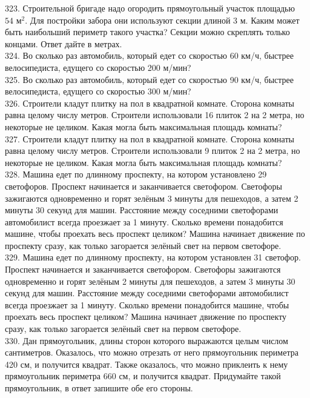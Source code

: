 \documentclass[12pt]{article}
\begin{document}
323. Строительной бригаде надо огородить прямоугольный участок площадью $54\text{ м}^2.$ Для постройки забора они используют секции длиной 3 м. Каким может быть
наибольший периметр такого участка? Секции можно скреплять только концами. Ответ дайте в метрах.\\
324. Во сколько раз автомобиль, который едет со скоростью 60 км/ч, быстрее велосипедиста, едущего со скоростью 200 м/мин?\\
325. Во сколько раз автомобиль, который едет со скоростью 90 км/ч, быстрее велосипедиста, едущего со скоростью 300 м/мин?\\
326. Строители кладут плитку на пол в квадратной комнате. Сторона комнаты равна целому числу метров. Строители использовали 16 плиток 2 на 2 метра,
но некоторые не целиком. Какая могла быть максимальная площадь комнаты?\\
327. Строители кладут плитку на пол в квадратной комнате. Сторона комнаты равна целому числу метров. Строители использовали 9 плиток 2 на 2 метра,
но некоторые не целиком. Какая могла быть максимальная площадь комнаты?\\
328. Машина едет по длинному проспекту, на котором установлено 29 светофоров. Проспект начинается и заканчивается светофором. Светофоры зажигаются одновременно и горят зелёным 3 минуты для пешеходов, а затем 2 минуты 30 секунд для машин. Расстояние между соседними
светофорами автомобилист всегда проезжает за 1 минуту. Сколько времени понадобится машине, чтобы проехать весь проспект целиком? Машина начинает движение по проспекту сразу, как только загорается зелёный свет на первом светофоре.\\
329. Машина едет по длинному проспекту, на котором установлен 31 светофор. Проспект начинается и заканчивается светофором. Светофоры зажигаются одновременно и горят зелёным 2 минуты для пешеходов, а затем 3 минуты 30 секунд для машин. Расстояние между соседними светофорами автомобилист всегда проезжает за 1 минуту. Сколько времени понадобится машине, чтобы проехать весь проспект целиком? Машина начинает движение по проспекту сразу, как только загорается зелёный свет на первом светофоре.\\
330. Дан прямоугольник, длины сторон которого выражаются целым числом сантиметров. Оказалось, что можно отрезать от него прямоугольник периметра 420 см, и получится квадрат. Также оказалось, что можно приклеить к нему прямоугольник периметра 660 см, и получится квадрат. Придумайте такой прямоугольник, в ответ запишите обе его стороны.\\
\end{document}
